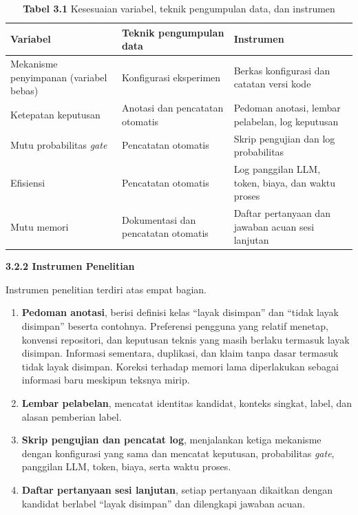 \documentclass[12pt,a4paper]{article}
\newcommand{\asing}[1]{\textit{#1}}
\newcommand{\subsubbab}[2]{%
  \par\vspace{0.5em}\phantomsection\label{#2}%
  \noindent\textbf{#1}\par\nopagebreak\vspace{0.2em}}
\begin{document}
\begin{table}[h]
\centering
\captionsetup{labelformat=empty,font=small,skip=4pt}
\caption{\textbf{Tabel 3.1} Kesesuaian variabel, teknik pengumpulan data, dan instrumen}
\begin{singlespace}
\small
\begin{tabularx}{\linewidth}{>{\raggedright\arraybackslash}X >{\raggedright\arraybackslash}X >{\raggedright\arraybackslash}X}
\toprule
\textbf{Variabel} & \textbf{Teknik pengumpulan data} & \textbf{Instrumen} \\
\midrule
Mekanisme penyimpanan (variabel bebas) & Konfigurasi eksperimen & Berkas konfigurasi dan catatan versi kode \\
Ketepatan keputusan & Anotasi dan pencatatan otomatis & Pedoman anotasi, lembar pelabelan, log keputusan \\
Mutu probabilitas \asing{gate} & Pencatatan otomatis & Skrip pengujian dan log probabilitas \\
Efisiensi & Pencatatan otomatis & Log panggilan LLM, token, biaya, dan waktu proses \\
Mutu memori & Dokumentasi dan pencatatan otomatis & Daftar pertanyaan dan jawaban acuan sesi lanjutan \\
\bottomrule
\end{tabularx}
\end{singlespace}
\end{table}

\subsubbab{3.2.2 Instrumen Penelitian}{sec:3.2.2}

Instrumen penelitian terdiri atas empat bagian.
\begin{enumerate}[leftmargin=1.25cm]
\item \textbf{Pedoman anotasi}, berisi definisi kelas ``layak disimpan'' dan ``tidak layak disimpan'' beserta contohnya. Preferensi pengguna yang relatif menetap, konvensi repositori, dan keputusan teknis yang masih berlaku termasuk layak disimpan. Informasi sementara, duplikasi, dan klaim tanpa dasar termasuk tidak layak disimpan. Koreksi terhadap memori lama diperlakukan sebagai informasi baru meskipun teksnya mirip.
\item \textbf{Lembar pelabelan}, mencatat identitas kandidat, konteks singkat, label, dan alasan pemberian label.
\item \textbf{Skrip pengujian dan pencatat log}, menjalankan ketiga mekanisme dengan konfigurasi yang sama dan mencatat keputusan, probabilitas \asing{gate}, panggilan LLM, token, biaya, serta waktu proses.
\item \textbf{Daftar pertanyaan sesi lanjutan}, setiap pertanyaan dikaitkan dengan kandidat berlabel ``layak disimpan'' dan dilengkapi jawaban acuan.
\end{enumerate}
\end{document}
